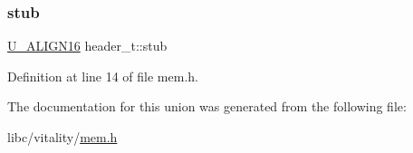 \subsubsection{\texorpdfstring{stub}{stub}}
{\footnotesize\ttfamily \hyperlink{a00134_a9093ff6c6894ca213db42a2d686d0ad6_a9093ff6c6894ca213db42a2d686d0ad6}{U\+\_\+\+A\+L\+I\+G\+N16} header\+\_\+t\+::stub}



Definition at line 14 of file mem.\+h.



The documentation for this union was generated from the following file\+:\begin{DoxyCompactItemize}
\item 
libc/vitality/\hyperlink{a00164}{mem.\+h}\end{DoxyCompactItemize}

